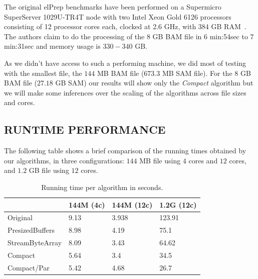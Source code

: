 \documentclass[a4paper,twoside]{article}
\begin{document}

The original elPrep benchmarks have been performed on a Supermicro SuperServer 1029U-TR4T node with two
Intel Xeon Gold 6126 processors consisting of 12 processor cores each, clocked at 2.6 GHz, with 384 GB RAM~\cite{costanza:2019}.
The authors claim to do the processing of the 8 GB BAM file in 6 min:54sec to 7 min:31sec and memory usage is $330-340$ GB\@.

As we didn't have access to such a performing machine, we did most of testing with the smallest file, the $144$ MB BAM file ($673.3$ MB SAM file). For the $8$ GB BAM file ($27.18$ GB SAM) our results will show only the {\textit{Compact} } algorithm but we will make some inferences over the scaling of the algorithms across file sizes and cores.





\subsection{\uppercase{Runtime performance}}
\label{subsec:runtimeperf}

The following table shows a brief comparison of the running times obtained by our algorithms, in three configurations: $144$ MB file using $4$ cores and $12$ cores, and $1.2$ GB file using $12$ cores. 

\begin{table}[h]
	  \caption{Running time per algorithm in seconds.}\centering
	 
\begin{tabular}{|C{2.3cm}|C{1.15cm}|C{1.15cm}|C{1.15cm}|}
\hline
						& 144M (4c)	& 144M (12c)		& 1.2G (12c)	\\ \hline
Original				& 9.13 			& 3.938 			& 123.91 		\\ \hline
PresizedBuffers			& 8.98 			& 4.19 				& 75.1 			\\ \hline
StreamByteArray			& 8.09 			& 3.43 				& 64.62 		\\ \hline
Compact 				& 5.64 			& 3.4 	 			& 34.5			\\ \hline
Compact/Par 			& 5.42		    & 4.68				& 26.7 			\\ \hline
\end{tabular}
\end{table}
\end{document}
